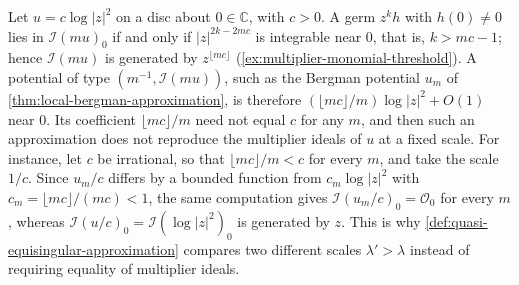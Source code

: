 \begin{example}\label{ex:analytic-regularization-endpoints}
Let $u=c\log|z|^2$ on a disc about $0\in\mathbb C$, with $c>0$. A germ $z^kh$ with $h(0)\neq0$ lies in $\mathcal I(mu)_0$ if and only if $|z|^{2k-2mc}$ is integrable near $0$, that is, $k>mc-1$; hence $\mathcal I(mu)$ is generated by $z^{\lfloor mc\rfloor}$ (\cref{ex:multiplier-monomial-threshold}). A potential of type $(m^{-1},\mathcal I(mu))$, such as the Bergman potential $u_m$ of \cref{thm:local-bergman-approximation}, is therefore $(\lfloor mc\rfloor/m)\log|z|^2+O(1)$ near $0$. Its coefficient $\lfloor mc\rfloor/m$ need not equal $c$ for any $m$, and then such an approximation does not reproduce the multiplier ideals of $u$ at a fixed scale. For instance, let $c$ be irrational, so that $\lfloor mc\rfloor/m<c$ for every $m$, and take the scale $1/c$. Since $u_m/c$ differs by a bounded function from $c_m\log|z|^2$ with $c_m=\lfloor mc\rfloor/(mc)<1$, the same computation gives $\mathcal I(u_m/c)_0=\mathcal O_0$ for every $m$, whereas $\mathcal I(u/c)_0=\mathcal I(\log|z|^2)_0$ is generated by $z$. This is why \cref{def:quasi-equisingular-approximation} compares two different scales $\lambda'>\lambda$ instead of requiring equality of multiplier ideals.
\end{example}


